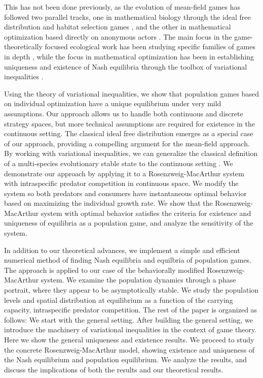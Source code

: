 This has not been done previously, as the evolution of mean-field games has followed two parallel tracks, one in mathematical biology through the ideal free distribution and habitat selection games \citep{fretwell1969territorial, parker1978searching, cressman2004ideal, kvrivan2008ideal, cressman2010ideal, broom2013game}, and the other in mathematical optimization based directly on anonymous actors \citep{lasry2007mean, aumann1964markets, blanchet2016optimal}. The main focus in the game-theoretically focused ecological work has been studying specific families of games in depth \cite{broom2013game}, while the focus in mathematical optimization has been in establishing uniqueness and existence of Nash equilibria through the toolbox of variational inequalities \citep{karamardian1969nonlinear, gabay1980uniqueness, nabetani2011parametrized}.



Using the theory of variational inequalities, we show that population games based on individual optimization have a unique equilibrium under very mild assumptions. Our approach allows us to handle both continuous and discrete strategy spaces, but more technical assumptions are required for existence in the continuous setting. The classical ideal free distribution emerges as a special case of our approach, providing a compelling argument for the mean-field approach. By working with variational inequalities, we can generalize the classical definition of a multi-species evolutionary stable state to the continuous setting \citep{cressman2001evolutionary}. We demonstrate our approach by applying it to a Rosenzweig-MacArthur system with intraspecific predator competition in continuous space. We modify the system so both predators and consumers have instantaneous optimal behavior based on maximizing the individual growth rate. We show that the Rosenzweig-MacArthur system with optimal behavior satisfies the criteria for existence and uniqueness of equilibria as a population game, and analyze the sensitivity of the system.


In addition to our theoretical advances, we implement a simple and efficient numerical method of finding Nash equilibria and equilbria of population games. The approach is applied to our case of the behaviorally modified Rosenzweig-MacArthur system. We examine the population dynamics through a phase portrait, where they appear to be asymptotically stable. We study the population levels and spatial distribution at equilibrium as a function of the carrying capacity, intraspecific predator competition. The rest of the paper is organized as follows: We start with the general setting. After building the general setting, we introduce the machinery of variational inequalities in the context of game theory. Here we show the general uniqueness and existence results. We proceed to study the concrete Rosenzweig-MacArthur model, showing existence and uniqueness of the Nash equilibrium and population equilibrium. We analyze the results, and discuss the implications of both the results and our theoretical results.
